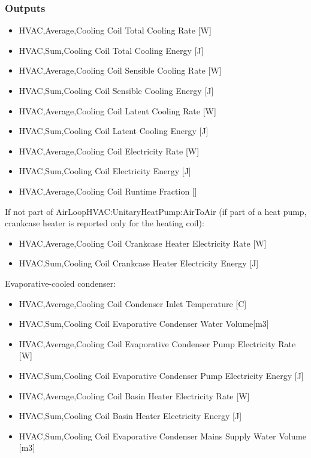 \subsubsection{Outputs}\label{outputs-12-002}

\begin{itemize}
\item
  HVAC,Average,Cooling Coil Total Cooling Rate {[}W{]}
\item
  HVAC,Sum,Cooling Coil Total Cooling Energy {[}J{]}
\item
  HVAC,Average,Cooling Coil Sensible Cooling Rate {[}W{]}
\item
  HVAC,Sum,Cooling Coil Sensible Cooling Energy {[}J{]}
\item
  HVAC,Average,Cooling Coil Latent Cooling Rate {[}W{]}
\item
  HVAC,Sum,Cooling Coil Latent Cooling Energy {[}J{]}
\item
  HVAC,Average,Cooling Coil Electricity Rate {[}W{]}
\item
  HVAC,Sum,Cooling Coil Electricity Energy {[}J{]}
\item
  HVAC,Average,Cooling Coil Runtime Fraction {[]}
\end{itemize}

If not part of AirLoopHVAC:UnitaryHeatPump:AirToAir (if part of a heat pump, crankcase heater is reported only for the heating coil):

\begin{itemize}
\item
  HVAC,Average,Cooling Coil Crankcase Heater Electricity Rate {[}W{]}
\item
  HVAC,Sum,Cooling Coil Crankcase Heater Electricity Energy {[}J{]}
\end{itemize}

Evaporative-cooled condenser:

\begin{itemize}
\item
  HVAC,Average,Cooling Coil Condenser Inlet Temperature {[}C{]}
\item
  HVAC,Sum,Cooling Coil Evaporative Condenser Water Volume{[}m3{]}
\item
  HVAC,Average,Cooling Coil Evaporative Condenser Pump Electricity Rate {[}W{]}
\item
  HVAC,Sum,Cooling Coil Evaporative Condenser Pump Electricity Energy {[}J{]}
\item
  HVAC,Average,Cooling Coil Basin Heater Electricity Rate {[}W{]}
\item
  HVAC,Sum,Cooling Coil Basin Heater Electricity Energy {[}J{]}
\item
  HVAC,Sum,Cooling Coil Evaporative Condenser Mains Supply Water Volume {[}m3{]}
\end{itemize}

